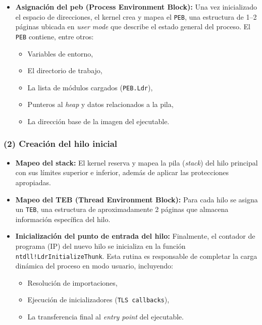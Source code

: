 \begin{itemize}[leftmargin=1.5cm]
    \item \textbf{Asignación del \acrshort{peb} (Process Environment Block):}  
    Una vez inicializado el espacio de direcciones, el kernel crea y mapea el \texttt{PEB}, una estructura de 1--2 páginas ubicada en \textit{user mode} que describe el estado general del proceso.  
    El \texttt{PEB} contiene, entre otros:
    \begin{itemize}
        \item Variables de entorno,
        \item El directorio de trabajo,
        \item La lista de módulos cargados (\texttt{PEB.Ldr}),
        \item Punteros al \textit{heap} y datos relacionados a la pila,
        \item La dirección base de la imagen del ejecutable.
    \end{itemize}

\end{itemize}

\subsubsection*{(2) Creación del hilo inicial}

\begin{itemize}[leftmargin=1.5cm]

    \item \textbf{Mapeo del stack:}  
    El kernel reserva y mapea la pila (\textit{stack}) del hilo principal con sus límites superior e inferior, además de aplicar las protecciones apropiadas.

    \item \textbf{Mapeo del TEB (Thread Environment Block):}  
    Para cada hilo se asigna un \texttt{TEB}, una estructura de aproximadamente 2 páginas que almacena información específica del hilo.

    \item \textbf{Inicialización del punto de entrada del hilo:}  
    Finalmente, el contador de programa (IP) del nuevo hilo se inicializa en la función  
    \texttt{ntdll!LdrInitializeThunk}.  
    Esta rutina es responsable de completar la carga dinámica del proceso en modo usuario, incluyendo:
    \begin{itemize}
        \item Resolución de importaciones,
        \item Ejecución de inicializadores (\texttt{TLS callbacks}),
        \item La transferencia final al \textit{entry point} del ejecutable.
    \end{itemize}

\end{itemize}


